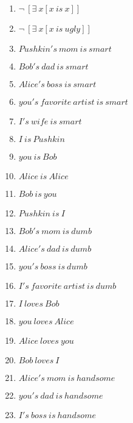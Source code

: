 \documentclass{article}
\begin{document}
\begin{enumerate}
\item $\neg \ [\exists \ x[x \ is \ x]]$

\item $\neg \ [\exists \ x[x \ is \ ugly]]$

\item $Pushkin's \ mom \ is \ smart$

\item $Bob's \ dad \ is \ smart$

\item $Alice's \ boss \ is \ smart$

\item $you's \ favorite \ artist \ is \ smart$

\item $I's \ wife \ is \ smart$

\item $I \ is \ Pushkin$

\item $you \ is \ Bob$

\item $Alice \ is \ Alice$

\item $Bob \ is \ you$

\item $Pushkin \ is \ I$

\item $Bob's \ mom \ is \ dumb$

\item $Alice's \ dad \ is \ dumb$

\item $you's \ boss \ is \ dumb$

\item $I's \ favorite \ artist \ is \ dumb$

\item $I \ loves \ Bob$

\item $you \ loves \ Alice$

\item $Alice \ loves \ you$

\item $Bob \ loves \ I$

\item $Alice's \ mom \ is \ handsome$

\item $you's \ dad \ is \ handsome$

\item $I's \ boss \ is \ handsome$


\end{enumerate}
\end{document}
